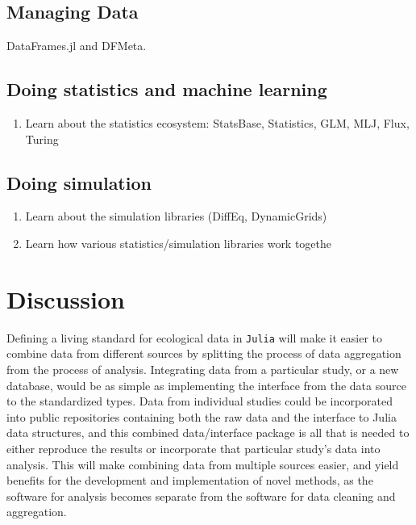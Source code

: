 \documentclass[10pt,oneside]{article}
\begin{document}
\hypertarget{managing-data}{%
\subsection{Managing Data}\label{managing-data}}

DataFrames.jl and DFMeta.

\hypertarget{doing-statistics-and-machine-learning}{%
\subsection{Doing statistics and machine
learning}\label{doing-statistics-and-machine-learning}}

\begin{enumerate}
\def\labelenumi{\arabic{enumi}.}
\setcounter{enumi}{6}
\tightlist
\item
  Learn about the statistics ecosystem: StatsBase, Statistics, GLM, MLJ,
  Flux, Turing
\end{enumerate}

\hypertarget{doing-simulation}{%
\subsection{Doing simulation}\label{doing-simulation}}

\begin{enumerate}
\def\labelenumi{\arabic{enumi}.}
\setcounter{enumi}{7}
\tightlist
\item
  Learn about the simulation libraries (DiffEq, DynamicGrids)
\item
  Learn how various statistics/simulation libraries work togethe
\end{enumerate}

\hypertarget{discussion}{%
\section{Discussion}\label{discussion}}

Defining a living standard for ecological data in \texttt{Julia} will
make it easier to combine data from different sources by splitting the
process of data aggregation from the process of analysis. Integrating
data from a particular study, or a new database, would be as simple as
implementing the interface from the data source to the standardized
types. Data from individual studies could be incorporated into public
repositories containing both the raw data and the interface to Julia
data structures, and this combined data/interface package is all that is
needed to either reproduce the results or incorporate that particular
study's data into analysis. This will make combining data from multiple
sources easier, and yield benefits for the development and
implementation of novel methods, as the software for analysis becomes
separate from the software for data cleaning and aggregation.
\end{document}
